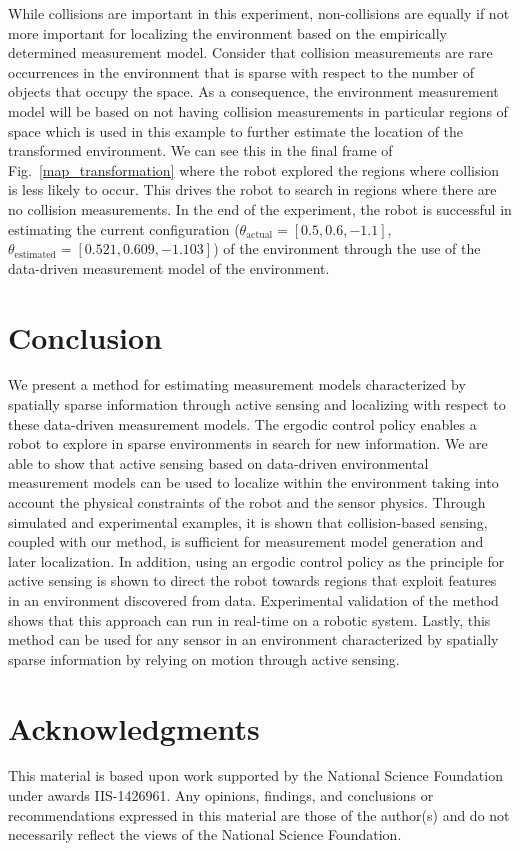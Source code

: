 \documentclass[conference]{IEEEtran}
\begin{document}
While collisions are important in this experiment, non-collisions are equally if not more important for localizing the environment based on the empirically determined measurement model.
Consider that collision measurements are rare occurrences in the environment that is sparse with respect to the number of objects that occupy the space.
As a consequence, the environment measurement model will be based on not having collision measurements in particular regions of space which is used in this example to further estimate the location of the transformed environment. 
We can see this in the final frame of Fig.~\ref{map_transformation} where the robot explored the regions where collision is less likely to occur.
This drives the robot to search in regions where there are no collision measurements.
In the end of the experiment, the robot is successful in estimating the current configuration ($\theta_\text{actual} = \left[ 0.5, 0.6, -1.1 \right]$, $\theta_\text{estimated} = \left[ 0.521, 0.609, -1.103 \right]$) of the environment through the use of the data-driven measurement model of the environment. 

\section{Conclusion}
\label{sec:conclusions}
We present a method for estimating measurement models characterized by spatially sparse information through active sensing and localizing with respect to these data-driven measurement models.
The ergodic control policy enables a robot to explore in sparse environments in search for new information.
We are able to show that active sensing based on data-driven environmental measurement models can be used to localize within the environment taking into account the physical constraints of the robot and the sensor physics.
Through simulated and experimental examples, it is shown that collision-based sensing, coupled with our method, is sufficient for measurement model generation and later localization.
In addition, using an ergodic control policy as the principle for active sensing is shown to direct the robot towards regions that exploit features in an environment discovered from data.
Experimental validation of the method shows that this approach can run in real-time on a robotic system.
Lastly, this method can be used for any sensor in an environment characterized by spatially sparse information by relying on motion through active sensing.



\section*{Acknowledgments}
This material is based upon work supported by the National Science Foundation under awards IIS-1426961. Any opinions, findings, and conclusions or recommendations expressed in this material are those of the author(s) and do not necessarily reflect the views of the National Science Foundation.

\balance


{\small
}
\end{document}
